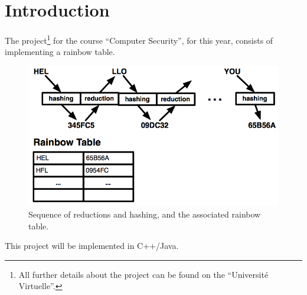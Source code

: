 \documentclass[11pt,a4paper]{article}
\begin{document}



\section{Introduction}
The project\footnote{All further details about the project can be found on the ``Université Virtuelle''.} for the course ``Computer Security'', for this year, consists of implementing a rainbow table.
\begin{figure}[!h]
	\center
	\includegraphics[scale=0.3]{HashRedRainbowTable.png}
	\caption{Sequence of reductions and hashing, and the associated rainbow table. \protect\footnotemark}
	\label{HashRedRainbowTable}
\end{figure}
This project will be implemented in C++/Java.

\end{document}
